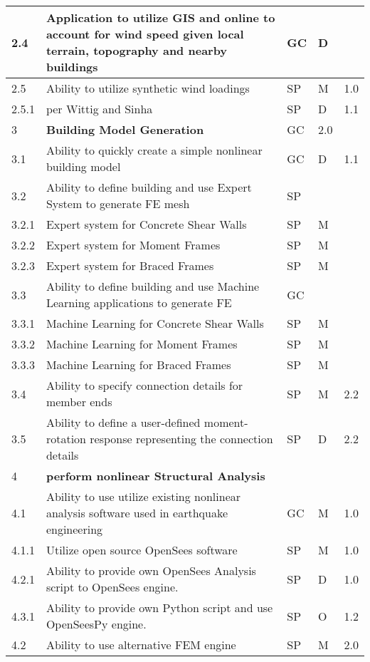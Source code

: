 \begin{longtable}{| p{} | p{} | p{} | p{} |  p{} |}
2.4 & Application to utilize GIS and online to account for wind speed given local terrain, topography and nearby buildings & GC & D & \\ \hline
2.5 & Ability to utilize synthetic wind loadings & SP & M & 1.0  \\ \hline
2.5.1 & per Wittig and Sinha & SP & D & 1.1  \\ \hline
3 & \textbf{Building Model Generation} & GC & 2.0 \\ \hline
3.1 & Ability to quickly create a simple nonlinear building model & GC & D & 1.1 \\ \hline
3.2  & Ability to define building and use Expert System to generate FE mesh & SP & &  \\ \hline
	3.2.1 & Expert system for Concrete Shear Walls & SP & M &  \\ \hline
	3.2.2 & Expert system for Moment Frames & SP & M &  \\ \hline
	3.2.3 & Expert system for  Braced Frames & SP & M &   \\ \hline
3.3 & Ability to define building and use Machine Learning applications to generate FE & GC &  &  \\ \hline
	3.3.1 & Machine Learning for Concrete Shear Walls & SP & M &  \\ \hline
	3.3.2 & Machine Learning for Moment Frames & SP & M &  \\ \hline
	3.3.3 & Machine Learning for Braced Frames & SP & M &   \\ \hline
	3.4 & Ability to specify connection details for member ends & SP & M & 2.2 \\ \hline
	3.5 & Ability to define a user-defined moment-rotation response representing the connection details & SP & D & 2.2 \\ \hline
	4 & \textbf{perform nonlinear Structural Analysis} &  &  \\ \hline
4.1 & Ability to use utilize existing nonlinear analysis software used in earthquake engineering & GC & M & 1.0 \\ \hline
4.1.1 & Utilize open source OpenSees software & SP & M & 1.0 \\ \hline
4.2.1 & Ability to provide own OpenSees Analysis script to OpenSees engine. & SP & D & 1.0 \\ \hline
4.3.1 & Ability to provide own Python script and use OpenSeesPy engine. & SP & O & 1.2 \\ \hline
4.2 & Ability to use alternative FEM engine & SP & M & 2.0 \\ \hline

\end{longtable}
